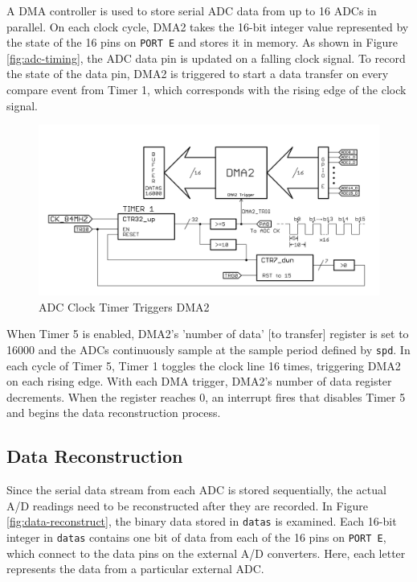 \documentclass[11pt,twoside]{mitthesis}
\begin{document}
A DMA controller is used to store serial ADC data from up to 16 ADCs in parallel.
On each clock cycle, DMA2 takes the 16-bit integer value represented by the state of the 16 pins on \texttt{PORT E} and stores it in memory. 
As shown in Figure \ref{fig:adc-timing}, the ADC data pin is updated on a falling clock signal.
To record the state of the data pin, DMA2 is triggered to start a data transfer on every compare event from Timer 1, which corresponds with the rising edge of the clock signal.

\begin{figure}[H]
  \begin{center}
      \includegraphics[width=1\textwidth]{../ADC-DMA.png}
      \caption{ADC Clock Timer Triggers DMA2}
  \end{center}
\end{figure}

When Timer 5 is enabled, DMA2's 'number of data' [to transfer] register is set to 16000  and the ADCs continuously sample at the sample period defined by \texttt{spd}.
In each cycle of Timer 5, Timer 1 toggles the clock line 16 times, triggering DMA2 on each rising edge.
With each DMA trigger, DMA2's number of data register decrements.
When the register reaches 0, an interrupt fires that disables Timer 5 and begins the data reconstruction process.


\subsection{Data Reconstruction}

Since the serial data stream from each ADC is stored sequentially, the actual A/D readings need to be reconstructed after they are recorded.
In Figure \ref{fig:data-reconstruct}, the binary data stored in \texttt{datas} is examined.
Each 16-bit integer in \texttt{datas} contains one bit of data from each of the 16 pins on \texttt{PORT E}, which connect to the data pins on the external A/D converters.
Here, each letter represents the data from a particular external ADC.
\end{document}
